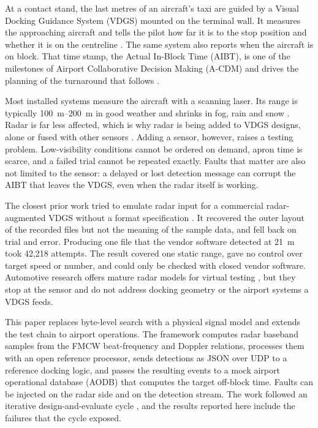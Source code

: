 \documentclass[conference]{IEEEtran}
\begin{document}
At a contact stand, the last metres of an aircraft's taxi are guided by a Visual Docking Guidance System (VDGS) mounted on the terminal wall. It measures the approaching aircraft and tells the pilot how far it is to the stop position and whether it is on the centreline \cite{us6762694}. The same system also reports when the aircraft is on block. That time stamp, the Actual In-Block Time (AIBT), is one of the milestones of Airport Collaborative Decision Making (A-CDM) and drives the planning of the turnaround that follows \cite{icao_acdm,caas_acdm}.

Most installed systems measure the aircraft with a scanning laser. Its range is typically \SIrange{100}{200}{\metre} in good weather and shrinks in fog, rain and snow \cite{us10384805}. Radar is far less affected, which is why radar is being added to VDGS designs, alone or fused with other sensors \cite{us11756440}. Adding a sensor, however, raises a testing problem. Low-visibility conditions cannot be ordered on demand, apron time is scarce, and a failed trial cannot be repeated exactly. Faults that matter are also not limited to the sensor: a delayed or lost detection message can corrupt the AIBT that leaves the VDGS, even when the radar itself is working.

The closest prior work tried to emulate radar input for a commercial radar-augmented VDGS without a format specification \cite{khalil2020radar}. It recovered the outer layout of the recorded files but not the meaning of the sample data, and fell back on trial and error. Producing one file that the vendor software detected at \SI{21}{\metre} took 42{,}218 attempts. The result covered one static range, gave no control over target speed or number, and could only be checked with closed vendor software. Automotive research offers mature radar models for virtual testing \cite{magosi2022survey}, but they stop at the sensor and do not address docking geometry or the airport systems a VDGS feeds.

This paper replaces byte-level search with a physical signal model and extends the test chain to airport operations. The framework computes radar baseband samples from the FMCW beat-frequency and Doppler relations, processes them with an open reference processor, sends detections as JSON over UDP to a reference docking logic, and passes the resulting events to a mock airport operational database (AODB) that computes the target off-block time. Faults can be injected on the radar side and on the detection stream. The work followed an iterative design-and-evaluate cycle \cite{peffers2007dsr}, and the results reported here include the failures that the cycle exposed.
\end{document}
